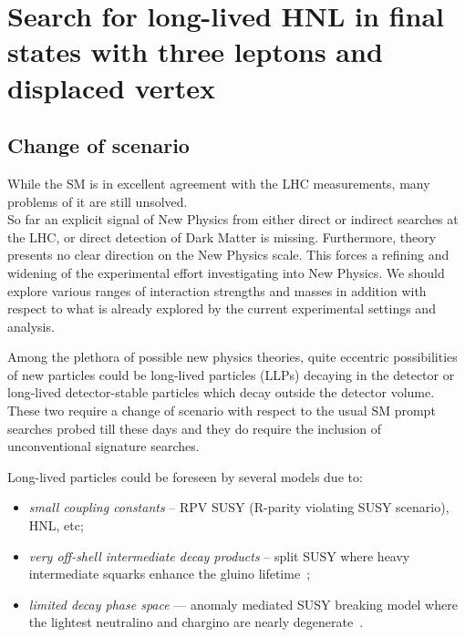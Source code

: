 \chapter{Search for long-lived HNL in final states
with three leptons and displaced vertex} \label{Chapter6} 

\section{Change of scenario}
While the SM is in excellent agreement with the LHC measurements, many problems of it are still unsolved.\\
So far an explicit signal of New Physics from either direct or indirect
searches at the LHC, or direct detection of Dark Matter is
missing. Furthermore, theory presents no clear direction on the New Physics scale.
This forces a refining and widening of the experimental effort
investigating into New Physics. We should explore various ranges of
interaction strengths and masses in addition with respect to
what is already explored by the current experimental
settings and analysis.

Among the plethora of possible new physics theories, quite eccentric
possibilities of new particles could be long-lived particles (LLPs)
decaying in the detector or long-lived detector-stable particles which decay outside the detector volume. 
These two require a change of scenario with respect to the usual SM
prompt searches probed till these days and they do require the
inclusion of unconventional signature searches.

Long-lived particles could be foreseen by several models due to:
\begin{itemize}
\setlength\itemsep{-0.1em}
\item \emph{small coupling constants} -- \ie RPV SUSY (R-parity violating
  SUSY scenario), HNL, etc;
\item \emph{very off-shell intermediate decay products} -- \ie split SUSY where
heavy intermediate squarks enhance
the gluino lifetime~\cite{ATLAS-CONF-2019-006,2020135114};
\item \emph{limited decay phase space} --- \ie
anomaly mediated SUSY breaking
model where the lightest neutralino
and chargino are nearly degenerate~\cite{Sirunyan:2019wau,Sirunyan:2019gut}.
\end{itemize}

